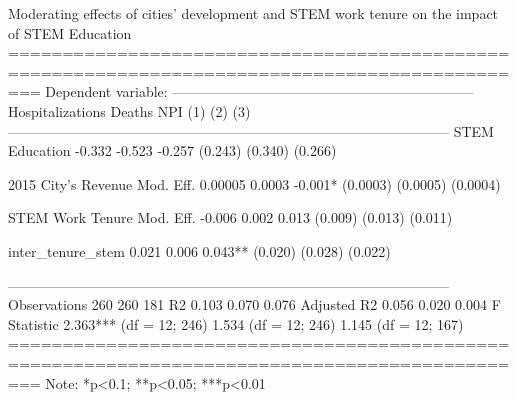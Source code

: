 
Moderating effects of cities’ development and STEM work tenure on the impact of STEM Education
===============================================================================================
                                                     Dependent variable:                       
                              -----------------------------------------------------------------
                                 Hospitalizations            Deaths                NPI         
                                        (1)                   (2)                  (3)         
-----------------------------------------------------------------------------------------------
STEM Education                        -0.332                 -0.523               -0.257       
                                      (0.243)               (0.340)              (0.266)       
                                                                                               
2015 City's Revenue Mod. Eff.         0.00005                0.0003              -0.001*       
                                     (0.0003)               (0.0005)             (0.0004)      
                                                                                               
STEM Work Tenure Mod. Eff.            -0.006                 0.002                0.013        
                                      (0.009)               (0.013)              (0.011)       
                                                                                               
inter_tenure_stem                      0.021                 0.006               0.043**       
                                      (0.020)               (0.028)              (0.022)       
                                                                                               
-----------------------------------------------------------------------------------------------
Observations                            260                   260                  181         
R2                                     0.103                 0.070                0.076        
Adjusted R2                            0.056                 0.020                0.004        
F Statistic                   2.363*** (df = 12; 246) 1.534 (df = 12; 246) 1.145 (df = 12; 167)
===============================================================================================
Note:                                                               *p<0.1; **p<0.05; ***p<0.01
